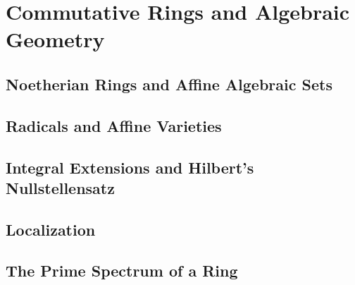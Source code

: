 \chapter{Commutative Rings and Algebraic Geometry}

\section{Noetherian Rings and Affine Algebraic Sets}

\section{Radicals and Affine Varieties}

\section{Integral Extensions and Hilbert's Nullstellensatz}

\section{Localization}

\section{The Prime Spectrum of a Ring}

